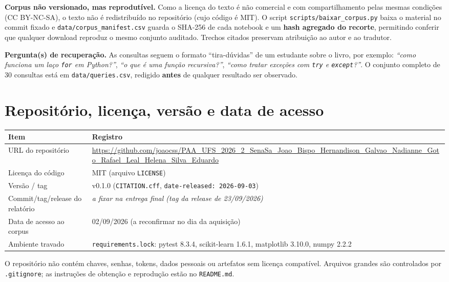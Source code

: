 \documentclass[11pt,a4paper]{article}
\begin{document}
\begin{nota}
\textbf{Corpus não versionado, mas reprodutível.} Como a licença do texto é não comercial e com
compartilhamento pelas mesmas condições (CC BY-NC-SA), o texto não é redistribuído no repositório
(cujo código é MIT). O script \texttt{scripts/baixar\_corpus.py} baixa o material no commit fixado e
\texttt{data/corpus\_manifest.csv} guarda o SHA-256 de cada notebook e um \textbf{hash agregado do
recorte}, permitindo conferir que qualquer download reproduz o mesmo conjunto auditado. Trechos
citados preservam atribuição ao autor e ao tradutor.
\end{nota}

\textbf{Pergunta(s) de recuperação.} As consultas seguem o formato ``tira-dúvidas'' de um estudante
sobre o livro, por exemplo: \emph{``como funciona um laço \texttt{for} em Python?''},
\emph{``o que é uma função recursiva?''}, \emph{``como tratar exceções com \texttt{try} e
\texttt{except}?''}. O conjunto completo de 30 consultas está em \texttt{data/queries.csv}, redigido
\textbf{antes} de qualquer resultado ser observado.

\section{Repositório, licença, versão e data de acesso}
\begin{table}[h]
\small\centering
\begin{tabularx}{\textwidth}{@{}p{4.2cm}Y@{}}
\toprule
\textbf{Item} & \textbf{Registro}\\
\midrule
URL do repositório & \url{https://github.com/joaocss/PAA_UFS_2026_2_SenaSa_Joao_Bispo_Hernandison_Galvao_Nadianne_Goto_Rafael_Leal_Helena_Silva_Eduardo}\\
Licença do código & MIT (arquivo \texttt{LICENSE})\\
Versão / tag & v0.1.0 (\texttt{CITATION.cff}, \texttt{date-released: 2026-09-03})\\
Commit/tag/release do relatório & \emph{a fixar na entrega final (tag da release de 23/09/2026)}\\
Data de acesso ao corpus & 02/09/2026 (a reconfirmar no dia da aquisição)\\
Ambiente travado & \texttt{requirements.lock}: pytest 8.3.4, scikit-learn 1.6.1, matplotlib 3.10.0, numpy 2.2.2\\
\bottomrule
\end{tabularx}
\end{table}
O repositório não contém chaves, senhas, tokens, dados pessoais ou artefatos sem licença compatível.
Arquivos grandes são controlados por \texttt{.gitignore}; as instruções de obtenção e reprodução
estão no \texttt{README.md}.
\end{document}
